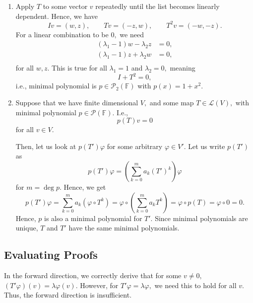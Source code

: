 \documentclass[12pt]{article}
\begin{document}
\begin{enumerate}
\begin{itemize}
      \item Assume $T$ has some eigenvector $v.$ Then by the above,
        $T^{-1}$ has eigenvector $v.$ By the above, the converse is
        also true. Hence, $T$ has eigenvector $v$ if and only if
        $T^{-1}$ has eigenvector $v,$ meaning $T, T^{-1}$ have the
        same eigenvectors.
    \end{itemize}

  \item Apply $T$ to some vector $v$ repeatedly until the list
    becomes linearly dependent. Hence, we have
    $$
    Iv = (w, z), \qquad Tv = (-z, w), \qquad T^2v = (-w, -z).
    $$
    For a linear combination to be $0,$ we need
    \begin{align*}
      (\lambda_1 -1)w - \lambda_2 z  &= 0, \\
      (\lambda_1 -1)z + \lambda_2 w  &= 0, \\
    \end{align*}
    for all $w, z.$ This is true for all $\lambda_1 = 1$ and
    $\lambda_2 = 0,$ meaning
    $$
    I + T^2 = 0,
    $$
    i.e., minimal polynomial is $p \in \mathcal P_2(\mathbb F)$ with
    $p(x) = 1+ x^2.$

  \item Suppose that we have finite dimensional $V,$ and some map $T
    \in \mathcal L(V),$ with minimal polynomial $p \in \mathcal
    P(\mathbb F).$ I.e.,
    $$
    p(T) v = 0
    $$
    for all $v \in V.$

    Then, let us look at $p(T') \varphi$ for some arbitrary $\varphi
    \in V'.$ Let us write $p(T')$ as
    $$
    p(T')\varphi = \left(\sum_{k = 0}^{m} a_k (T')^{k} \right) \varphi
    $$
    for $m = \deg p.$ Hence, we get
    $$
    p(T') \varphi = \sum_{k = 0}^{m} a_k (\varphi \circ T^{k} ) =
    \varphi \circ \left(
      \sum_{k = 0}^{m} a_k T^{k}
    \right) = \varphi \circ p(T) = \varphi \circ 0 = 0.
    $$
    Hence, $p$ is also a minimal polynomial for $T'.$ Since minimal
    polynomials are unique, $T$ and $T'$ have the same minimal polynomials.
\end{enumerate}

\subsection{Evaluating Proofs}
In the forward direction, we correctly derive that for some $v \neq
0,$ $(T'\varphi)(v) = \lambda \varphi(v).$ However, for $T' \varphi =
\lambda \varphi,$ we need this to hold for all $v.$ Thus, the forward
direction is insufficient.
\end{document}
